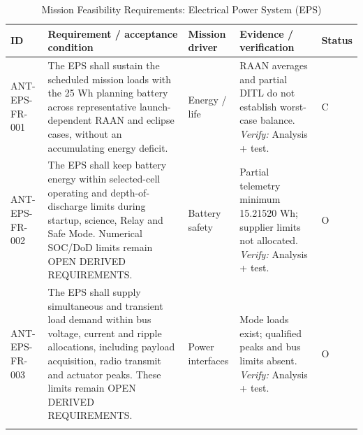 \begin{table}[H]\centering\small\setlength{\tabcolsep}{3pt}
\caption{Mission Feasibility Requirements: Electrical Power System (EPS)}\label{tab:fr-eps}
\begin{tabular}{@{}
>{\RaggedRight\arraybackslash}p{}
>{\RaggedRight\arraybackslash}p{}
>{\RaggedRight\arraybackslash}p{}
>{\RaggedRight\arraybackslash}p{}
>{\RaggedRight\arraybackslash}p{}
@{}}
\toprule ID & Requirement / acceptance condition & Mission driver & Evidence / verification & Status\\\midrule
{}\label{req:ANT-EPS-FR-001}\mbox{ANT-EPS-}\newline\mbox{FR-001} & The EPS shall sustain the scheduled mission loads with the 25 Wh planning battery across representative launch-dependent RAAN and eclipse cases, without an accumulating energy deficit. & Energy / life & RAAN averages and partial DITL do not establish worst-case balance. \emph{Verify:} Analysis + test. & C\\
\addlinespace[3pt]
\label{req:ANT-EPS-FR-002}\mbox{ANT-EPS-}\newline\mbox{FR-002} & The EPS shall keep battery energy within selected-cell operating and depth-of-discharge limits during startup, science, Relay and Safe Mode. Numerical SOC/DoD limits remain OPEN DERIVED REQUIREMENTS. & Battery safety & Partial telemetry minimum 15.21520 Wh; supplier limits not allocated. \emph{Verify:} Analysis + test. & O\\
\addlinespace[3pt]
\label{req:ANT-EPS-FR-003}\mbox{ANT-EPS-}\newline\mbox{FR-003} & The EPS shall supply simultaneous and transient load demand within bus voltage, current and ripple allocations, including payload acquisition, radio transmit and actuator peaks. These limits remain OPEN DERIVED REQUIREMENTS. & Power interfaces & Mode loads exist; qualified peaks and bus limits absent. \emph{Verify:} Analysis + test. & O\\
\addlinespace[3pt]
\bottomrule
\end{tabular}
\end{table}
